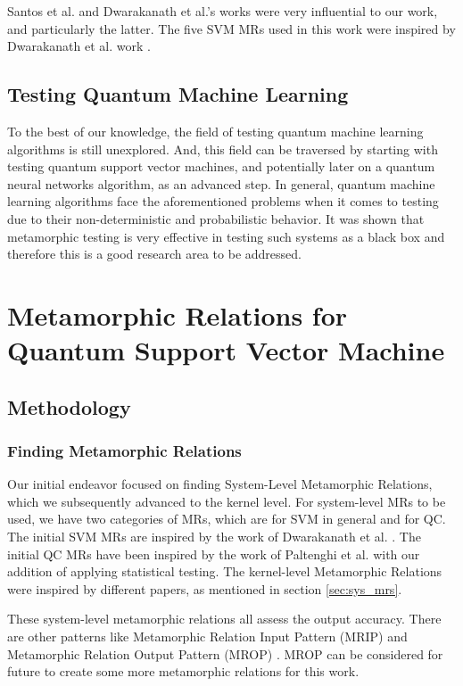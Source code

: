 \documentclass[12pt,a4paper]{article}
\begin{document}
	Santos et al. \cite{ssantos2020} and Dwarakanath et al.'s \cite{Dwarakanath2018} works were very influential to our work, and particularly the latter. The five SVM MRs used in this work were inspired by Dwarakanath et al. work \cite{Dwarakanath2018}.
	
	\subsection{Testing Quantum Machine Learning}
	
	To the best of our knowledge, the field of testing quantum machine learning algorithms is still unexplored. And, this field can be traversed by starting with testing quantum support vector machines, and potentially later on a quantum neural networks algorithm, as an advanced step. In general, quantum machine learning algorithms face the aforementioned problems when it comes to testing due to their non-deterministic and probabilistic behavior. It was shown that metamorphic testing is very effective in testing such systems as a black box and therefore this is a good research area to be addressed.
	
	
	\section{Metamorphic Relations for Quantum Support Vector Machine}
	\label{sec:mrs}
	
	\subsection{Methodology}
	
	\subsubsection{Finding Metamorphic Relations}
	
	Our initial endeavor focused on finding System-Level Metamorphic Relations, which we subsequently advanced to the kernel level. For system-level MRs to be used, we have two categories of MRs, which are for SVM in general and for QC. The initial SVM MRs are inspired by the work of Dwarakanath et al. \cite{Dwarakanath2018}. The initial QC MRs have been inspired by the work of Paltenghi et al. \cite{Paltenghi2023} with our addition of applying statistical testing. The kernel-level Metamorphic Relations  were inspired by different papers, as mentioned in section \ref{sec:sys_mrs}.
	
	These system-level metamorphic relations all assess the output accuracy. There are other patterns like Metamorphic Relation Input Pattern (MRIP) and Metamorphic Relation Output Pattern (MROP) \cite{8785455}. MROP can be considered for future to create some more metamorphic relations for this work. 
	
\end{document}
